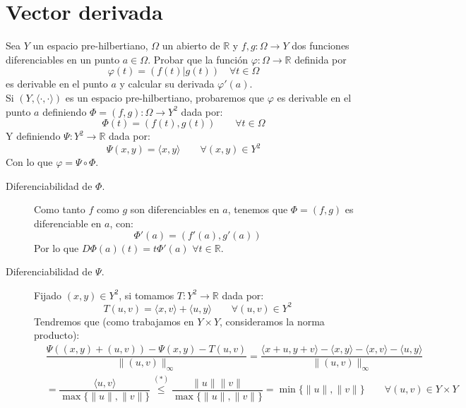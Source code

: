 \section{Vector derivada}

\begin{ejercicio}
Sea \( Y \) un espacio pre-hilbertiano, \( \Omega \) un abierto de \( \mathbb{R} \) y \( f,g : \Omega \rightarrow Y \) dos funciones diferenciables en un punto \( a \in \Omega \). Probar que la función \( \varphi : \Omega \rightarrow \mathbb{R} \) definida por
\[
\varphi(t) = \left( f(t) | g(t) \right) \quad \forall t \in \Omega
\]
es derivable en el punto \( a \) y calcular su derivada \( \varphi'(a) \).\\

\noindent
Si $(Y, \langle \cdot,\cdot \rangle )$ es un espacio pre-hilbertiano, probaremos que $\varphi$ es derivable en el punto $a$ definiendo $\Phi=(f,g):\Omega\to Y^2$ dada por:
\begin{equation*}
    \Phi(t) = (f(t), g(t))\qquad \forall t\in \Omega
\end{equation*}
Y definiendo $\Psi:Y^2\to \mathbb{R}$ dada por:
\begin{equation*}
    \Psi(x,y) = \langle x,y \rangle  \qquad \forall (x,y)\in Y^2
\end{equation*}
Con lo que $\varphi = \Psi \circ \Phi$.
\begin{description}
    \item [Diferenciabilidad de $\Phi$.] Como tanto $f$ como $g$ son diferenciables en $a$, tenemos que $\Phi = (f,g)$ es diferenciable en $a$, con:
        \begin{equation*}
            \Phi'(a) = \left(f'(a), g'(a)\right)
        \end{equation*}
        Por lo que $D\Phi(a)(t) = t\Phi'(a)$ $\forall t\in \mathbb{R}$.
    \item [Diferenciabilidad de $\Psi$.] Fijado $(x,y)\in Y^2$, si tomamos $T:Y^2\to \mathbb{R}$ dada por:
        \begin{equation*}
            T(u,v) = \langle x,v \rangle  + \langle u,y \rangle  \qquad \forall (u,v)\in Y^2
        \end{equation*}
        Tendremos que (como trabajamos en $Y\times Y$, consideramos la norma producto):
        \begin{align*}
            &\dfrac{\Psi((x,y)+(u,v)) - \Psi(x,y) - T(u,v)}{\|(u,v)\|_\infty} = \dfrac{\langle x+u,y+v \rangle - \langle x,y \rangle - \langle x,v \rangle - \langle u,y \rangle }{\|(u,v)\|_\infty} \\ &= \dfrac{\langle u,v \rangle }{\max \{\|u\|, \|v\|\}} \stackrel{(\ast)}{\leq} \dfrac{\|u\|\|v\|}{\max\{\|u\|,\|v\|\}} = \min\{\|u\|,\|v\|\} \qquad \forall (u,v)\in Y\times Y

\end{align*}
\end{description}
\end{ejercicio}
